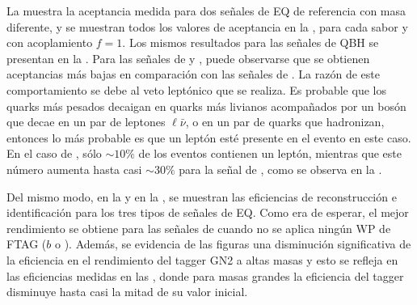 La \Tab{\ref{tab:signals:acc_eff:acceptances}} muestra la aceptancia medida para dos señales de \ac{EQ} de referencia con masa diferente, y se muestran todos los valores de aceptancia en la \Fig{\ref{fig:signals:acc_eff:acceptances:qstar}}, para cada sabor y con acoplamiento \(f=1\). Los mismos resultados para las señales de \ac{QBH} se presentan en la \Fig{\ref{fig:signals:acc_eff:acceptances:qbh}}.
Para las señales de \cstar y \bstar, puede observarse que se obtienen aceptancias más bajas en comparación con las señales de \qstar. La razón de este comportamiento se debe al veto leptónico que se realiza. Es probable que los quarks más pesados decaigan en quarks más livianos acompañados por un bosón \Wboson que decae en un par de leptones \(\ell \bar{\nu}\), o en un par de quarks que hadronizan, entonces lo más probable es que un leptón esté presente en el evento en este caso. En el caso de \qstar, sólo \(\sim 10\%\) de los eventos contienen un leptón, mientras que este número aumenta hasta casi \(\sim 30\%\) para la señal de \bstar, como se observa en la \Tab{\ref{tab:signals:acc_eff:acceptances}}.

Del mismo modo, en la \Fig{\ref{fig:signals:acc_eff:efficiencies}} y en la \Tab{\ref{tab:signals:acc_eff:efficiencies}}, se muestran las eficiencias de reconstrucción e identificación para los tres tipos de señales de \ac{EQ}. Como era de esperar, el mejor rendimiento se obtiene para las señales de \qstar cuando no se aplica ningún \ac{WP} de \ac{FTAG} (\(b\) o \ctagging). Además, se evidencia de las figuras una disminución significativa de la eficiencia en el rendimiento del tagger GN2 a altas masas y esto se refleja en las eficiencias medidas en las \Figs{\ref{fig:signals:acc_eff:efficiencies:cstar}}{\ref{fig:signals:acc_eff:efficiencies:bstar}}, donde para masas grandes la eficiencia del tagger disminuye hasta casi la mitad de su valor inicial.

